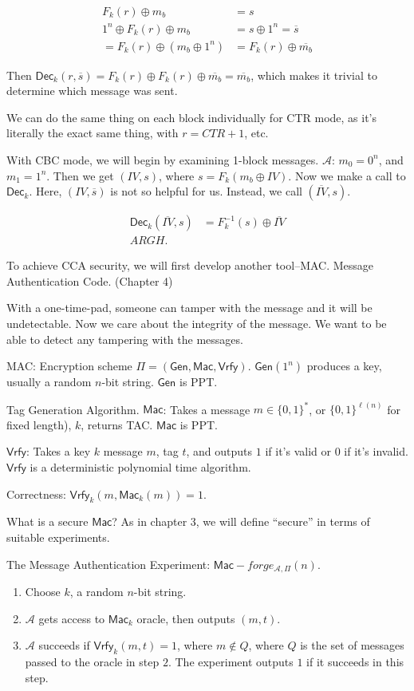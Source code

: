 \documentclass[12pt]{article}
\newcommand{\AAA}{\mathcal{A}}
\newcommand{\Dec}{\mathsf{Dec}}
\newcommand{\Mac}{\mathsf{Mac}}
\newcommand{\Vrfy}{\mathsf{Vrfy}}
\newcommand{\Gen}{\mathsf{Gen}}
\newcommand{\GenMacVrfy}{(\Gen,\Mac,\Vrfy)}
\newcommand{\xor}{\oplus}
\begin{document}
\begin{align*}
F_k(r)\xor m_b&=s\\
1^n\xor F_k(r)\xor m_b&=s\xor1^n=\overline{s}\\
=F_k(r)\xor(m_b\xor1^n)&=F_k(r)\xor\overline{m_b}
\end{align*}

Then $\Dec_k(r,\overline{s})=F_k(r)\xor F_k(r)\xor\overline{m_b}=\overline{m_b}$, which makes it trivial to determine which message was sent.

We can do the same thing on each block individually for CTR mode, as it's literally the exact same thing, with $r=CTR+1$, etc.

With CBC mode, we will begin by examining 1-block messages. $\AAA$: $m_0=0^n$, and $m_1=1^n$. Then we get $(IV,s)$, where $s=F_k(m_b\xor IV)$. Now we make a call to $\Dec_k$. Here, $(IV,\overline{s})$ is not so helpful for us. Instead, we call $(\overline{IV},s)$.

\begin{align*}
\Dec_k(\overline{IV},s)&=F^{-1}_k(s)\xor\overline{IV}\\
ARGH.
\end{align*}

To achieve CCA security, we will first develop another tool--MAC. Message Authentication Code. (Chapter 4)

With a one-time-pad, someone can tamper with the message and it will be undetectable. Now we care about the integrity of the message. We want to be able to detect any tampering with the messages.

MAC: Encryption scheme $\Pi=\GenMacVrfy$. $\Gen(1^n)$ produces a key, usually a random $n$-bit string. $\Gen$ is PPT.

Tag Generation Algorithm. $\Mac$: Takes a message $m\in\{0,1\}^*$, or $\{0,1\}^{\ell(n)}$ for fixed length), $k$, returns TAC. $\Mac$ is PPT.

$\Vrfy$: Takes a key $k$ message $m$, tag $t$, and outputs $1$ if it's valid or $0$ if it's invalid. $\Vrfy$ is a deterministic polynomial time algorithm.

Correctness: $\Vrfy_k(m,\Mac_k(m))=1$.

What is a secure $\Mac$? As in chapter 3, we will define ``secure'' in terms of suitable experiments.

The Message Authentication Experiment: $\Mac-forge_{\AAA,\Pi}(n)$.\begin{enumerate}

\item Choose $k$, a random $n$-bit string.

\item $\AAA$ gets access to $\Mac_k$ oracle, then outputs $(m,t)$.

\item $\AAA$ succeeds if $\Vrfy_k(m,t)=1$, where $m\not\in Q$, where $Q$ is the set of messages passed to the oracle in step $2$. The experiment outputs $1$ if it succeeds in this step.

\end{enumerate}
\end{document}
